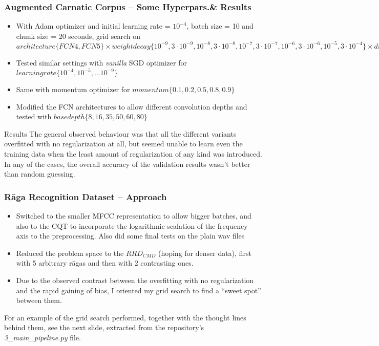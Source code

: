 \documentclass[hyperref={pdfpagelabels=false}]{beamer}
\begin{document}
\begin{frame}
  \frametitle{Augmented Carnatic Corpus -- Some Hyperpars.\& Results}
  \begin{itemize}
  \item With Adam optimizer and initial learning rate = $10^{-4}$, batch size = 10 and chunk size = 20 seconds, grid search on $architecture\{FCN4, FCN5\} \times weightdecay\{10^{-9}, 3\cdot 10^{-9}, 10^{-8}, 3\cdot 10^{-8}, 10^{-7}, 3\cdot 10^{-7}, 10^{-6}, 3\cdot 10^{-6}, 10^{-5}, 3\cdot 10^{-4}\} \times dropout\{1, 0.95, 0.9, 0.85, 0.8, 0.75, 0.65, 0.5\}$
  \item Tested similar settings with {\it vanilla} SGD optimizer for $learningrate\{10^{-4}, 10^{-5}, ... 10^{-9}\}$
  \item Same with momentum optimizer for $momentum\{0.1, 0.2, 0.5, 0.8, 0.9\}$
    \item Modified the FCN architectures to allow different convolution depths and tested with $basedepth\{8, 16, 35, 50, 60, 80\}$
  \end{itemize}

  \begin{block}{Results}
    \scriptsize The general observed behaviour was that all the different variants overfitted with no regularization at all, but seemed unable to learn even the training data when the least amount of regularization of any kind was introduced. In any of the cases, the overall accuracy of the validation results wasn't better than random guessing.
    \end{block}
\end{frame}

\begin{frame}
  \frametitle{R\=aga Recognition Dataset -- Approach}
  \begin{itemize}
  \item Switched to the smaller MFCC representation to allow bigger batches, and also to the CQT to incorporate the logarithmic scalation of the frequency axis to the preprocessing. Also did some final tests on the plain wav files
  \item Reduced the problem space to the $RRD_{CMD}$ (hoping for denser data), first with 5 arbitrary r\=agas and then with 2 contrasting ones.
  \item Due to the observed contrast between the overfitting with no regularization and the rapid gaining of bias, I oriented my grid search to find a ``sweet spot'' between them.
  \end{itemize}
  For an example of the grid search performed, together with the thought lines behind them, see the next slide, extracted from the repository's {\it 3\_main\_pipeline.py} file.
\end{frame}
\end{document}
